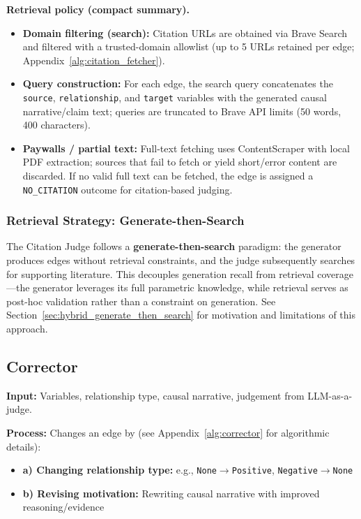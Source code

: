 \textbf{Retrieval policy (compact summary).}
\begin{itemize}[noitemsep]
    \item \textbf{Domain filtering (search):} Citation URLs are obtained via Brave Search and filtered with a trusted-domain allowlist (up to 5 URLs retained per edge; Appendix~\ref{alg:citation_fetcher}).
    \item \textbf{Query construction:} For each edge, the search query concatenates the \texttt{source}, \texttt{relationship}, and \texttt{target} variables with the generated causal narrative/claim text; queries are truncated to Brave API limits (50 words, 400 characters).
    \item \textbf{Paywalls / partial text:} Full-text fetching uses ContentScraper with local PDF extraction; sources that fail to fetch or yield short/error content are discarded. If no valid full text can be fetched, the edge is assigned a \texttt{NO\_CITATION} outcome for citation-based judging.
\end{itemize}

\subsubsection{Retrieval Strategy: Generate-then-Search}
\label{sec:retrieval_strategy}

The Citation Judge follows a \textbf{generate-then-search} paradigm: the generator produces edges without retrieval constraints, and the judge subsequently searches for supporting literature. This decouples generation recall from retrieval coverage---the generator leverages its full parametric knowledge, while retrieval serves as post-hoc validation rather than a constraint on generation. See Section~\ref{sec:hybrid_generate_then_search} for motivation and limitations of this approach.

\subsection{Corrector}
\label{sec:corrector}

\textbf{Input:} Variables, relationship type, causal narrative, judgement from LLM-as-a-judge.

\textbf{Process:} Changes an edge by (see Appendix~\ref{alg:corrector} for algorithmic details):
\begin{itemize}[noitemsep]
    \item \textbf{a) Changing relationship type:} e.g., \texttt{None}$\rightarrow$\texttt{Positive}, \texttt{Negative}$\rightarrow$\texttt{None}
    \item \textbf{b) Revising motivation:} Rewriting causal narrative with improved reasoning/evidence
\end{itemize}

